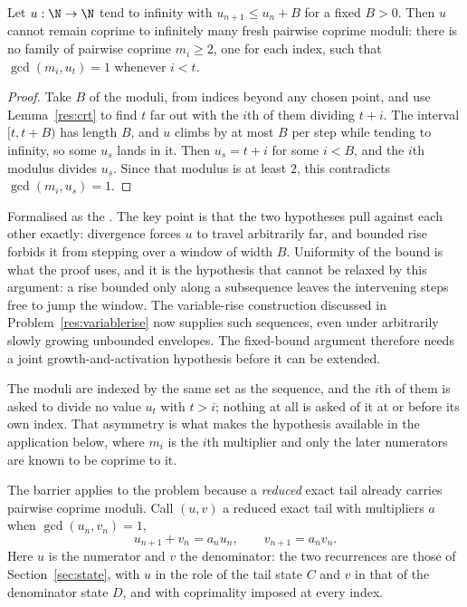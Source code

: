 \documentclass[11pt]{article}
\begin{document}
\begin{theorem}\label{res:barrier}
Let $u:\N\to\N$ tend to infinity with $u_{n+1}\le u_n+B$ for a fixed $B>0$.
Then $u$ cannot remain coprime to infinitely many fresh pairwise coprime
moduli: there is no family of pairwise coprime $m_i\ge2$, one for each index,
such that $\gcd(m_i,u_t)=1$ whenever $i<t$.
\end{theorem}

\begin{proof}
Take $B$ of the moduli, from indices beyond any chosen point, and use
Lemma~\ref{res:crt} to find $t$ far out with the $i$th of them dividing $t+i$.
The interval $[t,t+B)$ has length $B$, and $u$ climbs by at most $B$ per step
while tending to infinity, so some $u_s$ lands in it.  Then $u_s=t+i$ for some
$i<B$, and the $i$th modulus divides $u_s$.  Since that modulus is at least
$2$, this contradicts $\gcd(m_i,u_s)=1$.
\end{proof}

\noindent Formalised as the
.  The key point is that the two hypotheses pull against each other
exactly: divergence forces $u$ to travel arbitrarily far, and bounded rise
forbids it from stepping over a window of width $B$.  Uniformity of the bound
is what the proof uses, and it is the hypothesis that cannot be relaxed by this
argument: a rise bounded only along a subsequence leaves the intervening steps
free to jump the window.  The variable-rise construction discussed in
Problem~\ref{res:variablerise} now supplies such sequences, even under
arbitrarily slowly growing unbounded envelopes.  The fixed-bound argument
therefore needs a joint growth-and-activation hypothesis before it can be
extended.

The moduli are indexed by the same set as the sequence, and the $i$th of them
is asked to divide no value $u_t$ with $t>i$; nothing at all is asked of it at
or before its own index.  That asymmetry is what makes the hypothesis available
in the application below, where $m_i$ is the $i$th multiplier and only the
later numerators are known to be coprime to it.

The barrier applies to the problem because a \emph{reduced} exact tail already
carries pairwise coprime moduli.  Call $(u,v)$ a reduced exact tail with
multipliers $a$ when $\gcd(u_n,v_n)=1$,
\[
 u_{n+1}+v_n=a_nu_n,\qquad v_{n+1}=a_nv_n .
\]
Here $u$ is the numerator and $v$ the denominator: the two recurrences are
those of Section~\ref{sec:state}, with $u$ in the role of the tail state $C$
and $v$ in that of the denominator state $D$, and with coprimality imposed at
every index.
\end{document}
